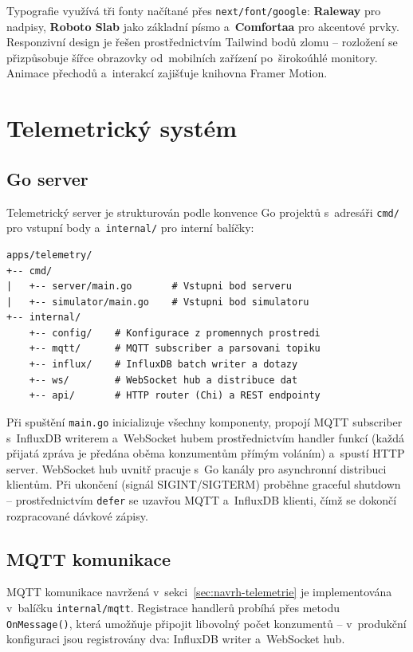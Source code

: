 Typografie využívá tři fonty načítané přes \texttt{next/font/google}: \textbf{Raleway} pro nadpisy, \textbf{Roboto Slab} jako základní písmo a~\textbf{Comfortaa} pro akcentové prvky. Responzivní design je řešen prostřednictvím Tailwind bodů zlomu -- rozložení se přizpůsobuje šířce obrazovky od~mobilních zařízení po~širokoúhlé monitory. Animace přechodů a~interakcí zajišťuje knihovna Framer Motion.

\section{Telemetrický systém}

\subsection{Go server}

Telemetrický server je strukturován podle konvence Go projektů s~adresáři \texttt{cmd/} pro vstupní body a~\texttt{internal/} pro interní balíčky:

\begin{verbatim}
apps/telemetry/
+-- cmd/
|   +-- server/main.go       # Vstupni bod serveru
|   +-- simulator/main.go    # Vstupni bod simulatoru
+-- internal/
    +-- config/    # Konfigurace z promennych prostredi
    +-- mqtt/      # MQTT subscriber a parsovani topiku
    +-- influx/    # InfluxDB batch writer a dotazy
    +-- ws/        # WebSocket hub a distribuce dat
    +-- api/       # HTTP router (Chi) a REST endpointy
\end{verbatim}

Při spuštění \texttt{main.go} inicializuje všechny komponenty, propojí MQTT subscriber s~InfluxDB writerem a~WebSocket hubem prostřednictvím handler funkcí (každá přijatá zpráva je předána oběma konzumentům přímým voláním) a~spustí HTTP server. WebSocket hub uvnitř pracuje s~Go kanály pro asynchronní distribuci klientům. Při ukončení (signál SIGINT/SIGTERM) proběhne graceful shutdown -- prostřednictvím \texttt{defer} se uzavřou MQTT a~InfluxDB klienti, čímž se dokončí rozpracované dávkové zápisy.

\subsection{MQTT komunikace}

MQTT komunikace navržená v~sekci~\ref{sec:navrh-telemetrie} je implementována v~balíčku \texttt{internal/mqtt}. Registrace handlerů probíhá přes metodu \texttt{OnMessage()}, která umožňuje připojit libovolný počet konzumentů -- v~produkční konfiguraci jsou registrovány dva: InfluxDB writer a~WebSocket hub.

